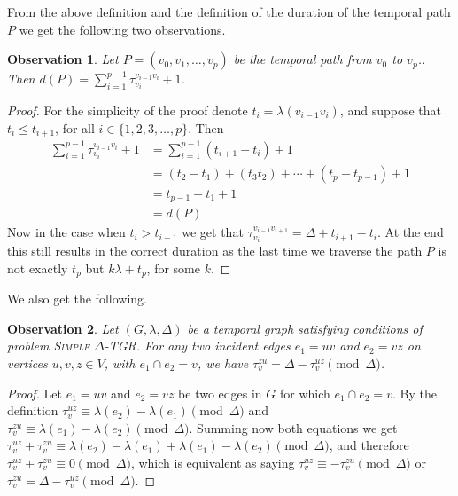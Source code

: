 \documentclass[11pt,a4paper]{article}
\newtheorem{observation}{Observation}
\theoremstyle{remark}
\theoremstyle{definition}
\newcommand{\deltaExact}{\textsc{Simple $\Delta$-TGR}}
\begin{document}
    From the above definition and the definition of the duration of the temporal path $P$ we get the following two observations.
    \begin{observation}\label{obs:durationPwithWaitingTimes}
        Let $P = (v_0, v_1, \dots, v_p)$ be the temporal path from $v_0$ to $v_p$..
        Then $d(P) = \sum_{i = 1}^{p-1} \tau_{v_i}^{v_{i-1}v_i} + 1 $.
    \end{observation}
    \begin{proof}
        For the simplicity of the proof denote $t_i = \lambda(v_{i-1}v_i)$, and suppose that $t_i \leq t_{i+1}$, for all $i \in \{1,2,3,\dots,p\}$.
        Then
        \begin{align*}
        \sum_{i = 1}^{p-1} \tau_{v_i}^{v_{i-1}v_i} + 1  
        &= \sum _{i = 1}^{p-1} (t_{i+1} - t_i) + 1 \\
        & = (t_2 - t_1) + (t_3  t_2) + \cdots + (t_p - t_{p-1}) + 1  \\
        & = t_{p-1} - t_1 + 1\\
        & = d(P)
        \end{align*}
        Now in the case when $t_i > t_{i+1}$ we get that $\tau_{v_i}^{v_{i-1}v_{i+1}} = \Delta + t_{i+1} - t_i$.
        At the end this still results in the correct duration as the last time we traverse the path $P$ is not exactly $t_p$ but $k \lambda + t_p$, for some $k$.
    \end{proof}
    We also get the following.
    \begin{observation}\label{obs:travel-delays-both-directions}
    Let $(G, \lambda, \Delta)$ be a temporal graph satisfying conditions of problem \deltaExact.
    For any two incident edges $e_1 = uv$ and $e_2 = vz$ on vertices $u,v,z \in V$, with $e_1 \cap e_2 = v$, we have $\tau_v^{zu} = \Delta - \tau_v^{uz} \pmod \Delta$.
    \end{observation}
    
    \begin{proof}
        Let $e_1 = uv$ and $e_2 = vz$ be two edges in $G$ for which $e_1 \cap e_2 = v$. 
        By the definition $\tau_v^{uz} \equiv \lambda (e_2) - \lambda(e_1) \pmod \Delta$ and $\tau_v^{zu} \equiv \lambda (e_1) - \lambda(e_2) \pmod \Delta$.
        Summing now both equations we get $\tau_v^{uz} + \tau_v^{zu} \equiv \lambda(e_2) - \lambda(e_1) + \lambda (e_1) - \lambda(e_2) \pmod \Delta$, and therefore $\tau_v^{uz} + \tau_v^{zu} \equiv 0 \pmod \Delta$, which is equivalent as saying $\tau_v^{uz} \equiv - \tau_v^{zu} \pmod \Delta$ or $\tau_v^{zu} = \Delta - \tau_v^{uz} \pmod \Delta$.
    \end{proof}
\end{document}
